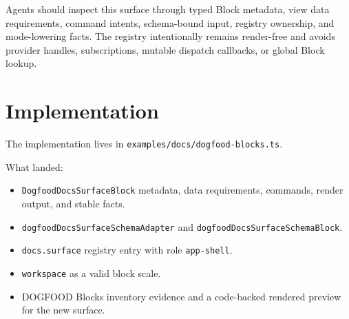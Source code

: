 Agents should inspect this surface through typed Block metadata, view data requirements, command intents, schema-bound input, registry ownership, and mode-lowering facts. The registry intentionally remains render-free and avoids provider handles, subscriptions, mutable dispatch callbacks, or global Block lookup.

\section{Implementation}\label{record-091-implementation}

The implementation lives in \texttt{e\allowbreak{}x\allowbreak{}a\allowbreak{}m\allowbreak{}p\allowbreak{}l\allowbreak{}e\allowbreak{}s\allowbreak{}/\allowbreak{}d\allowbreak{}o\allowbreak{}c\allowbreak{}s\allowbreak{}/\allowbreak{}d\allowbreak{}o\allowbreak{}g\allowbreak{}f\allowbreak{}o\allowbreak{}o\allowbreak{}d\allowbreak{}-\allowbreak{}b\allowbreak{}l\allowbreak{}o\allowbreak{}c\allowbreak{}k\allowbreak{}s\allowbreak{}.\allowbreak{}t\allowbreak{}s}.

What landed:

\begin{itemize}
\tightlist
\item
  \texttt{D\allowbreak{}o\allowbreak{}g\allowbreak{}f\allowbreak{}o\allowbreak{}o\allowbreak{}d\allowbreak{}D\allowbreak{}o\allowbreak{}c\allowbreak{}s\allowbreak{}S\allowbreak{}u\allowbreak{}r\allowbreak{}f\allowbreak{}a\allowbreak{}c\allowbreak{}e\allowbreak{}B\allowbreak{}l\allowbreak{}o\allowbreak{}c\allowbreak{}k} metadata, data requirements, commands, render output, and stable facts.
\item
  \texttt{d\allowbreak{}o\allowbreak{}g\allowbreak{}f\allowbreak{}o\allowbreak{}o\allowbreak{}d\allowbreak{}D\allowbreak{}o\allowbreak{}c\allowbreak{}s\allowbreak{}S\allowbreak{}u\allowbreak{}r\allowbreak{}f\allowbreak{}a\allowbreak{}c\allowbreak{}e\allowbreak{}S\allowbreak{}c\allowbreak{}h\allowbreak{}e\allowbreak{}m\allowbreak{}a\allowbreak{}A\allowbreak{}d\allowbreak{}a\allowbreak{}p\allowbreak{}t\allowbreak{}e\allowbreak{}r} and \texttt{d\allowbreak{}o\allowbreak{}g\allowbreak{}f\allowbreak{}o\allowbreak{}o\allowbreak{}d\allowbreak{}D\allowbreak{}o\allowbreak{}c\allowbreak{}s\allowbreak{}S\allowbreak{}u\allowbreak{}r\allowbreak{}f\allowbreak{}a\allowbreak{}c\allowbreak{}e\allowbreak{}S\allowbreak{}c\allowbreak{}h\allowbreak{}e\allowbreak{}m\allowbreak{}a\allowbreak{}B\allowbreak{}l\allowbreak{}o\allowbreak{}c\allowbreak{}k}.
\item
  \texttt{d\allowbreak{}o\allowbreak{}c\allowbreak{}s\allowbreak{}.\allowbreak{}s\allowbreak{}u\allowbreak{}r\allowbreak{}f\allowbreak{}a\allowbreak{}c\allowbreak{}e} registry entry with role \texttt{a\allowbreak{}p\allowbreak{}p\allowbreak{}-\allowbreak{}s\allowbreak{}h\allowbreak{}e\allowbreak{}l\allowbreak{}l}.
\item
  \texttt{w\allowbreak{}o\allowbreak{}r\allowbreak{}k\allowbreak{}s\allowbreak{}p\allowbreak{}a\allowbreak{}c\allowbreak{}e} as a valid block scale.
\item
  DOGFOOD Blocks inventory evidence and a code-backed rendered preview for the new surface.
\end{itemize}

